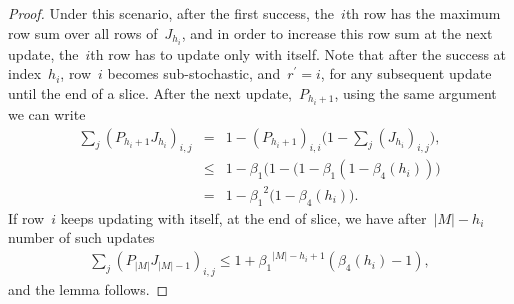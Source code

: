 \documentclass[draftclsnofoot, onecolumn, 12pt]{IEEEtran}
\begin{document}
\begin{proof}
Under this scenario, after the first success, the~$i$th row has the maximum row sum over all rows of~$J_{{h}_{i}}$, and in order to increase this row sum at the next update, the~$i$th row has to update only with itself. Note that after the success at index~$h_i$, row~$i$ becomes sub-stochastic, and~${r}^{\prime}=i$, for any subsequent update until the end of a slice. After the next update,~$P_{{h}_{i}+1}$, using the same argument we can write
\begin{eqnarray}\label{32}
\sum_{j}(P_{{h}_{i}+1} J_{{h}_{i}})_{i,j} & = & 1 -  (P_{{h}_{i}+1})_{i,i}\Bigg(1-\sum_{j}(J_{{h}_{i}})_{i,j}\Bigg),\nonumber\\
&\leq& 1 - \beta_1 \Bigg(1- (1 - \beta_1 (1-{\beta}_4({h}_{i}))\Bigg)\nonumber\\
&=& 1 - {\beta_1}^{2} \Bigg(1-{\beta}_4({h}_{i})\Bigg).
\end{eqnarray}
If row~$i$ keeps updating with itself, at the end of slice, we have after~${\vert {M}\vert - {h}_{i}}$ number of such updates
\begin{eqnarray}\label{33}
\sum_{j}({P}_{\vert {M}\vert} J_{\vert {M}\vert -1 })_{i,j} \leq 1+{\beta_1}^{\vert {M}\vert - {h}_{i}+1}({\beta}_4({h}_{i}) -1),
\end{eqnarray}
and the lemma follows.
\end{proof}
\end{document}
